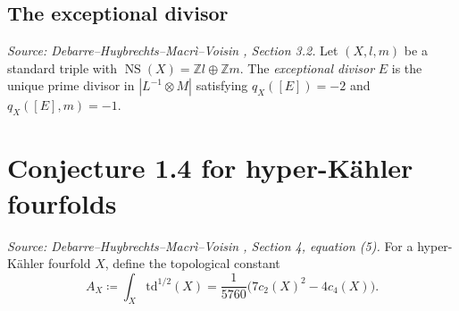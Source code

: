\subsection{The exceptional divisor}

\begin{definition}
  \label{def:exceptional-divisor}
  \textit{Source: Debarre--Huybrechts--Macr\`i--Voisin \cite{MR4654610}, Section 3.2.}
  Let \((X, l, m)\) be a standard triple with
  \(\operatorname{NS}(X) = \mathbb{Z}l \oplus \mathbb{Z}m\).  The
  \emph{exceptional divisor} \(E\) is the unique prime divisor in \(|L^{-1} \otimes M|\)
  satisfying \(q_X([E]) = -2\) and \(q_X([E], m) = -1\).
\end{definition}

\section{Conjecture 1.4 for hyper-K\"ahler fourfolds}

\begin{definition}
  \label{def:topological-constant}
  \textit{Source: Debarre--Huybrechts--Macr\`i--Voisin \cite{MR4654610}, Section 4, equation (5).}
  For a hyper-K\"ahler fourfold \(X\), define the topological constant
  \[
    A_X \coloneqq \int_X \mathrm{td}^{1/2}(X)
    = \frac{1}{5760}\bigl(7c_2(X)^2 - 4c_4(X)\bigr).
  \]
\end{definition}

